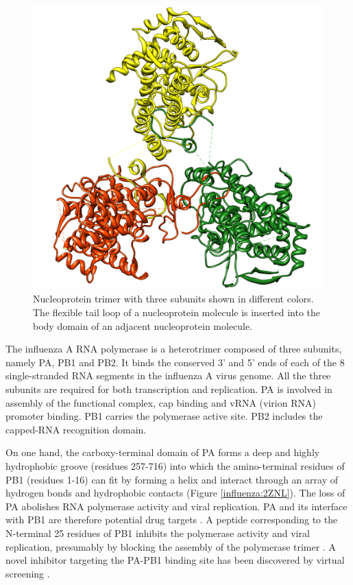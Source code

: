 \begin{figure}
\centering
\includegraphics[width=\linewidth]{../influenza/2IQH.png}
\caption{Nucleoprotein trimer with three subunits shown in different colors. The flexible tail loop of a nucleoprotein molecule is inserted into the body domain of an adjacent nucleoprotein molecule.}
\label{influenza:2IQH}
\end{figure}

The influenza A RNA polymerase is a heterotrimer composed of three subunits, namely PA, PB1 and PB2. It binds the conserved 3' and 5' ends of each of the 8 single-stranded RNA segments in the influenza A virus genome. All the three subunits are required for both transcription and replication. PA is involved in assembly of the functional complex, cap binding and vRNA (virion RNA) promoter binding. PB1 carries the polymerase active site. PB2 includes the capped-RNA recognition domain.

On one hand, the carboxy-terminal domain of PA forms a deep and highly hydrophobic groove (residues 257-716) into which the amino-terminal residues of PB1 (residues 1-16) can fit by forming a helix and interact through an array of hydrogen bonds and hydrophobic contacts \citep{1141} (Figure \ref{influenza:2ZNL}). The loss of PA abolishes RNA polymerase activity and viral replication. PA and its interface with PB1 are therefore potential drug targets \citep{1141}. A peptide corresponding to the N-terminal 25 residues of PB1 inhibits the polymerase activity and viral replication, presumably by blocking the assembly of the polymerase trimer \citep{1234}. A novel inhibitor targeting the PA-PB1 binding site has been discovered by virtual screening \citep{1235}.

